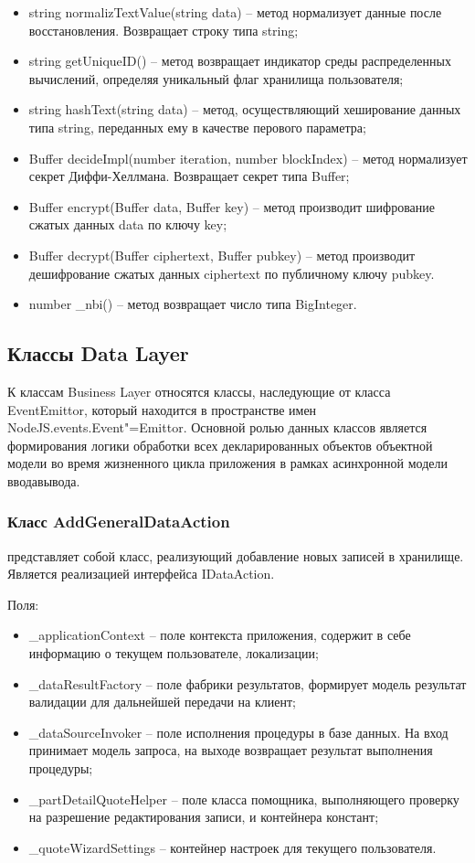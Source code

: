 \begin{itemize}
  \item string normalizTextValue(string data) – метод нормализует данные после восстановления. Возвращает строку типа string;
  \item string getUniqueID() – метод возвращает индикатор среды распределенных вычислений, определяя уникальный флаг хранилища пользователя;
  \item string hashText(string data) – метод, осуществляющий хеширование данных типа string, переданных ему в качестве перового параметра;
  \item Buffer decideImpl(number iteration, number  blockIndex) – метод нормализует секрет Диффи-Хеллмана. Возвращает секрет типа Buffer;
  \item Buffer encrypt(Buffer data, Buffer key) – метод производит шифрование сжатых данных data по ключу key;
  \item Buffer decrypt(Buffer ciphertext, Buffer pubkey) – метод производит дешифрование сжатых данных ciphertext по публичному ключу pubkey.
  \item number \_nbi() – метод возвращает число типа BigInteger.
\end{itemize}

\subsection{Классы Data Layer}
\label{sub:arch_and_mod:data_layer}

К классам Business Layer относятся классы, наследующие от класса EventEmittor, который находится в пространстве имен NodeJS.events.Event"=Emittor. Основной ролью данных классов является формирования логики обработки всех декларированных объектов объектной модели во время жизненного цикла приложения в рамках асинхронной модели ввода\/вывода.

\subsubsection{Класс AddGeneralDataAction }
\label{sub:arch_and_mod:data_layer:add_general_data_action}

представляет собой класс, реализующий добавление новых записей в хранилище. Является реализацией интерфейса IDataAction.

Поля:
\begin{itemize}
  \item \_applicationContext – поле контекста приложения, содержит в себе информацию о текущем пользователе, локализации;
  \item \_dataResultFactory – поле фабрики результатов, формирует модель результат валидации для дальнейшей передачи на клиент;
  \item \_dataSourceInvoker – поле исполнения процедуры в базе данных. На вход принимает модель запроса, на выходе возвращает результат выполнения процедуры;
  \item \_partDetailQuoteHelper – поле класса помощника, выполняющего проверку на разрешение редактирования записи, и контейнера констант;
  \item \_quoteWizardSettings – контейнер настроек для текущего пользователя.
\end{itemize}

